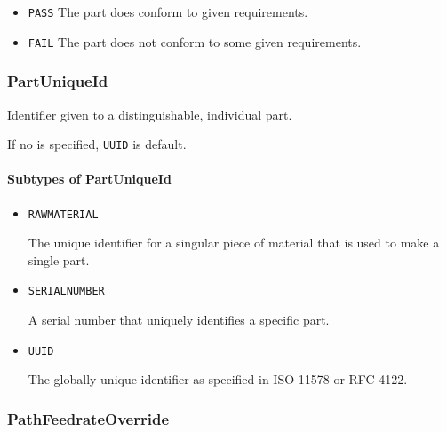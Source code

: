 \begin{itemize}
\item \texttt{PASS} \newline The part does conform to given requirements. 
\item \texttt{FAIL} \newline The part does not conform to some given requirements. 
\end{itemize}



\subsubsection{PartUniqueId}
\label{sec:PartUniqueId}



Identifier given to a distinguishable, individual part. 

If no  is specified, \texttt{UUID} is default.



\paragraph{Subtypes of PartUniqueId}\mbox{}
\label{sec:Subtypes of PartUniqueId}

\begin{itemize}

\item \texttt{RAW\textunderscore MATERIAL}


The unique identifier for a singular piece of material that is used to make a single part.

\item \texttt{SERIAL\textunderscore NUMBER}


A serial number that uniquely identifies a specific part.

\item \texttt{UUID}


The globally unique identifier as specified in ISO 11578 or RFC 4122.


\end{itemize}






\subsubsection{PathFeedrateOverride}
\label{sec:PathFeedrateOverride}



